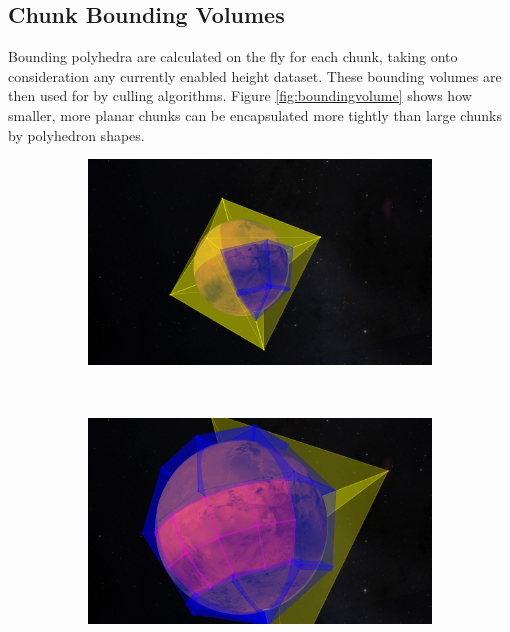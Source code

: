\subsection{Chunk Bounding Volumes}
\FloatBarrier
Bounding polyhedra are calculated on the fly for each chunk, taking onto consideration any currently enabled height dataset. These bounding volumes are then used for by culling algorithms. Figure \ref{fig:boundingvolume} shows how smaller, more planar chunks can be encapsulated more tightly than large chunks by polyhedron shapes.
\begin{figure}[h]
    \centering
    \begin{subfigure}[bt]{0.45\textwidth}
        \includegraphics[width=\textwidth]{figures/results/screenshots_thesis_old/bounds1.jpg}
        \caption{}
    \end{subfigure}
    ~
    \begin{subfigure}[bt]{0.45\textwidth}
        \includegraphics[width=\textwidth]{figures/results/screenshots_thesis_old/bounds2.jpg}
        \caption{}
    \end{subfigure}

\end{figure}
